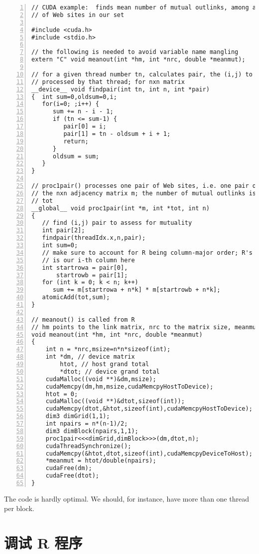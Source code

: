 \begin{lstlisting}[numbers=left]
// CUDA example:  finds mean number of mutual outlinks, among all pairs
// of Web sites in our set

#include <cuda.h>
#include <stdio.h>

// the following is needed to avoid variable name mangling
extern "C" void meanout(int *hm, int *nrc, double *meanmut);

// for a given thread number tn, calculates pair, the (i,j) to be
// processed by that thread; for nxn matrix
__device__ void findpair(int tn, int n, int *pair)
{  int sum=0,oldsum=0,i;
   for(i=0; ;i++) {
      sum += n - i - 1;
      if (tn <= sum-1) {
         pair[0] = i;
         pair[1] = tn - oldsum + i + 1;
         return;
      }
      oldsum = sum;
   }
}

// proc1pair() processes one pair of Web sites, i.e. one pair of rows in
// the nxn adjacency matrix m; the number of mutual outlinks is added to
// tot
__global__ void proc1pair(int *m, int *tot, int n)
{
   // find (i,j) pair to assess for mutuality
   int pair[2];
   findpair(threadIdx.x,n,pair);
   int sum=0;
   // make sure to account for R being column-major order; R's i-th row
   // is our i-th column here
   int startrowa = pair[0],
       startrowb = pair[1];
   for (int k = 0; k < n; k++)
      sum += m[startrowa + n*k] * m[startrowb + n*k];
   atomicAdd(tot,sum);
}

// meanout() is called from R
// hm points to the link matrix, nrc to the matrix size, meanmut to the output
void meanout(int *hm, int *nrc, double *meanmut)
{
    int n = *nrc,msize=n*n*sizeof(int);
    int *dm, // device matrix
        htot, // host grand total
        *dtot; // device grand total
    cudaMalloc((void **)&dm,msize);
    cudaMemcpy(dm,hm,msize,cudaMemcpyHostToDevice);
    htot = 0;
    cudaMalloc((void **)&dtot,sizeof(int));
    cudaMemcpy(dtot,&htot,sizeof(int),cudaMemcpyHostToDevice);
    dim3 dimGrid(1,1);
    int npairs = n*(n-1)/2;
    dim3 dimBlock(npairs,1,1);
    proc1pair<<<dimGrid,dimBlock>>>(dm,dtot,n);
    cudaThreadSynchronize();
    cudaMemcpy(&htot,dtot,sizeof(int),cudaMemcpyDeviceToHost);
    *meanmut = htot/double(npairs);
    cudaFree(dm);
    cudaFree(dtot);
}

\end{lstlisting}

The code is hardly optimal.  We should, for instance, have more than one
thread per block.

\section{调试 R 程序}

